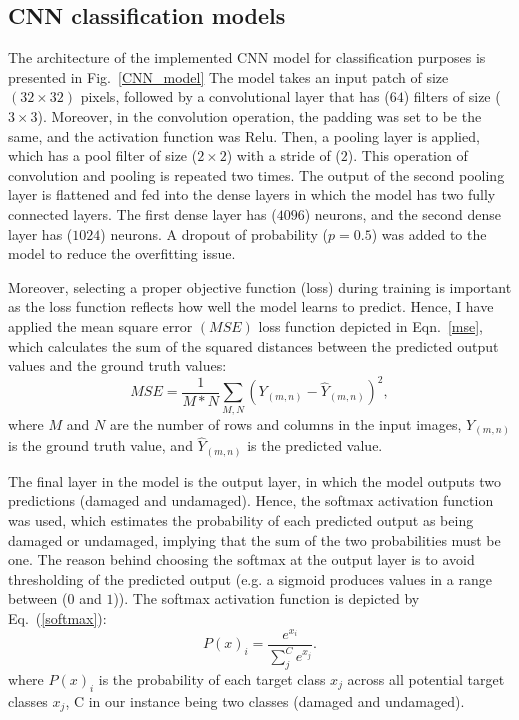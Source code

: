 \subsection{CNN classification models}
\label{sec422}
The architecture of the implemented CNN model for classification purposes is presented in Fig.~\ref{CNN_model}
The model takes an input patch of size \((32\times 32)\) pixels, followed by a convolutional layer that has (\(64\)) filters of size (\(3\times 3\)).
Moreover, in the convolution operation, the padding was set to be the same,  and the activation function was Relu.
Then, a pooling layer is applied, which has a pool filter of size (\(2\times 2\)) with a stride of (\(2\)).
This operation of convolution and pooling is repeated two times.
The output of the second pooling layer is flattened and fed into the dense layers in which the model has two fully connected layers.
The first dense layer has (\(4096\)) neurons, and the second dense layer has (\(1024\)) neurons.
A dropout of probability (\(p = 0.5\)) was added to the model to reduce the overfitting issue.

Moreover, selecting a proper objective function (loss) during training is important as the loss function reflects how well the model learns to predict.
Hence, I have applied the mean square error \((MSE)\) loss function depicted in Eqn.~\ref{mse}, which calculates the sum of the squared distances between the predicted output values and the ground truth values:
\begin{equation}
	MSE=\frac{1}{M*N}\sum_{M,N}^{}(Y_{(m,n)}-\hat{Y}_{(m,n)})^2,
	\label{mse}
\end{equation}
where \(M\) and \(N\) are the number of rows and columns in the input images, \(Y_{(m,n)}\) is the ground truth value, and \(\hat{Y}_{(m,n)}\) is the predicted value.

The final layer in the model is the output layer, in which the model outputs two predictions (damaged and undamaged).
Hence, the softmax activation function was used, which estimates the probability of each predicted output as being damaged or undamaged, implying that the sum of the two probabilities must be one.
The reason behind choosing the softmax at the output layer is to avoid thresholding of the predicted output (e.g. a sigmoid produces values in a range between (\(0\) and \(1\))).
The softmax activation function is depicted by Eq.~(\ref{softmax}): 
\begin{equation}
	P(x)_{i} = \frac{e^{x_{i}}}{\sum_{j}^{C} e^{x_{j}}}.
	\label{softmax}
\end{equation} 
where \(P(x)_{i}\) is the probability of each target class \(x_{j}\) across all potential target classes \(x_{j}\), C in our instance being two classes (damaged and undamaged).

